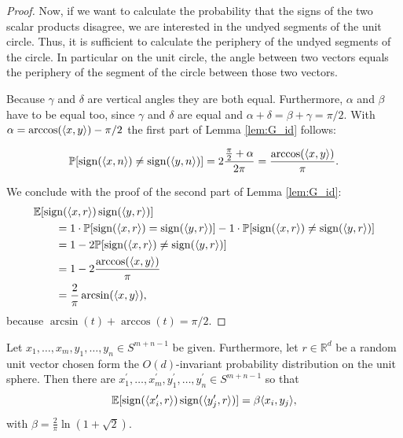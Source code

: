 \begin{proof}
\begin{minipage}{\textwidth}
			\hspace{12pt} Now, if we want to calculate the probability that the signs of the two scalar products disagree, we are interested in the undyed segments of the unit circle. Thus, it is sufficient to calculate the periphery of the undyed segments of the circle. In particular on the unit circle, the angle between two vectors equals the periphery of the segment of the circle between those two vectors. 
				
			\hspace{12pt} Because $\gamma$ and $\delta$ are vertical angles they are both equal. Furthermore, $\alpha$ and $\beta$ have to be equal too, since $\gamma$ and $\delta$ are equal and $\alpha+\delta = \beta+\gamma = \pi/2$. With $\alpha = \arccos(\langle{x},{y}\rangle) - \pi/2$ the first part of Lemma \ref{lem:G_id} follows:
		\end{minipage}
		\begin{align*}
			\mathbb{P}[\operatorname{sign}(\langle{x},{n}\rangle)\neq\operatorname{sign}(\langle{y},{n}\rangle)]=2\frac{\frac{\pi}{2}+\alpha}{2\pi} = \frac{\arccos(\langle{x},{y}\rangle)}{\pi}.
		\end{align*}
		
		\noindent We conclude with the proof of the second part of Lemma \ref{lem:G_id}: 
		\begin{align*}
			&\mathbb{E}[\operatorname{sign}(\langle{x},{r}\rangle) \operatorname{sign}(\langle{y},{r}\rangle)] \\
			&\qquad= 1\cdot\mathbb{P}[\operatorname{sign}(\langle{x},{r}\rangle) = \operatorname{sign} (\langle{y},{r}\rangle )] - 1\cdot \mathbb{P}[\operatorname{sign}(\langle{x},{r}\rangle) \neq \operatorname{sign}(\langle{y},{r}\rangle)] \\
			&\qquad= 1 - 2\mathbb{P}[\operatorname{sign}(\langle{x},{r}\rangle) \neq \operatorname{sign}(\langle{y},{r}\rangle)] \\
			&\qquad= 1 - 2 \frac{\arccos(\langle{x},{y}\rangle)}{\pi} \\
			&\qquad= \frac{2}{\pi} \arcsin(\langle{x},{y}\rangle),
		\end{align*}
		because $\arcsin (t) + \arccos(t) = \pi/2$.
	\end{proof}
	
	\begin{lemma}\label{lem:krivines_trick}
		Let $x_1,\dots,x_m,y_1,\dots,y_n\in S^{m+n-1}$ be given. Furthermore, let $r\in\mathbb{R}^d$ be a random unit vector chosen form the $O(d)$-invariant probability distribution on the unit sphere. Then there are $x_1^\prime,\dots,x_m^\prime, y_1^\prime,\dots,y_n^\prime\in S^{m+n-1}$ so that
		\begin{equation}
			\mathbb{E}[\operatorname{sign}(\langle{x_i^\prime},{r}\rangle)\operatorname{sign}(\langle{y_j^\prime},{r}\rangle)] = \beta \langle{x_i},{y_j}\rangle,
			\label{eq:krivines_trick}
		\end{equation}		
		with $\beta = \frac{2}{\pi} \ln (1+\sqrt{2}).$
	\end{lemma}
	
